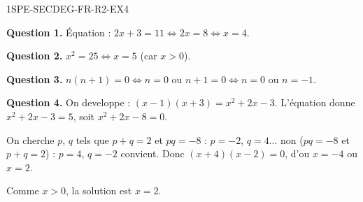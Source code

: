 \begin{corrige}{1SPE-SECDEG-FR-R2-EX4}

\textbf{Question 1.} Équation : $2x + 3 = 11 \Leftrightarrow 2x = 8 \Leftrightarrow x = 4$.

\textbf{Question 2.} $x^2 = 25 \Leftrightarrow x = 5$ (car $x > 0$).

\textbf{Question 3.} $n(n+1) = 0 \Leftrightarrow n = 0$ ou $n + 1 = 0 \Leftrightarrow n = 0$ ou $n = -1$.

\textbf{Question 4.} On developpe : $(x-1)(x+3) = x^2 + 2x - 3$. L'équation donne $x^2 + 2x - 3 = 5$, soit $x^2 + 2x - 8 = 0$.

On cherche $p$, $q$ tels que $p + q = 2$ et $pq = -8$ : $p = -2$, $q = 4$... non ($pq = -8$ et $p+q = 2$) : $p = 4$, $q = -2$ convient. Donc $(x + 4)(x - 2) = 0$, d'ou $x = -4$ ou $x = 2$.

Comme $x > 0$, la solution est $x = 2$.

\end{corrige}
